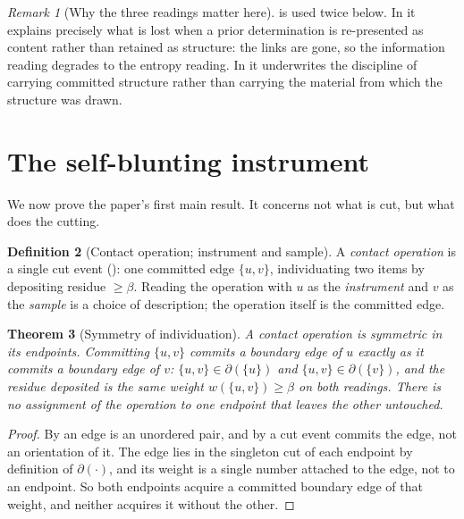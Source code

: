 \documentclass[11pt,twocolumn,a4paper]{article}
\theoremstyle{dirthm}
\newtheorem{theorem}{Theorem}[section]
\theoremstyle{definition}
\newtheorem{definition}[theorem]{Definition}
\theoremstyle{remark}
\newtheorem{remark}[theorem]{Remark}
\newcommand{\wt}{w}
\newcommand{\flo}{\beta}
\newcommand{\cut}{\partial}
\newcommand{\set}[1]{\{#1\}}
\begin{document}
\begin{remark}[Why the three readings matter here]
\label{rem:three-matters}
 is used twice below. In  it explains
precisely what is lost when a prior determination is re-presented as content
rather than retained as structure: the links are gone, so the information
reading degrades to the entropy reading. In  it
underwrites the discipline of carrying committed structure rather than
carrying the material from which the structure was drawn.
\end{remark}

\section{The self-blunting instrument}
\label{sec:cut}

We now prove the paper's first main result. It concerns not what is cut, but
what does the cutting.

\begin{definition}[Contact operation; instrument and sample]
\label{def:contact-op}
A \emph{contact operation} is a single cut event (): one
committed edge $\set{u,v}$, individuating two items by depositing residue
$\ge\flo$. Reading the operation with $u$ as the \emph{instrument} and $v$ as
the \emph{sample} is a choice of description; the operation itself is the
committed edge.
\end{definition}

\begin{theorem}[Symmetry of individuation]
\label{thm:symmetry}
A contact operation is symmetric in its endpoints. Committing $\set{u,v}$
commits a boundary edge of $u$ exactly as it commits a boundary edge of $v$:
$\set{u,v}\in\cut(\set{u})$ and $\set{u,v}\in\cut(\set{v})$, and the residue
deposited is the same weight $\wt(\set{u,v})\ge\flo$ on both readings. There
is no assignment of the operation to one endpoint that leaves the other
untouched.
\end{theorem}

\begin{proof}
By  an edge is an unordered pair, and by 
a cut event commits the edge, not an orientation of it. The edge lies in the
singleton cut of each endpoint by definition of $\cut(\cdot)$, and its weight
is a single number attached to the edge, not to an endpoint. So both
endpoints acquire a committed boundary edge of that weight, and neither
acquires it without the other.
\end{proof}
\end{document}
